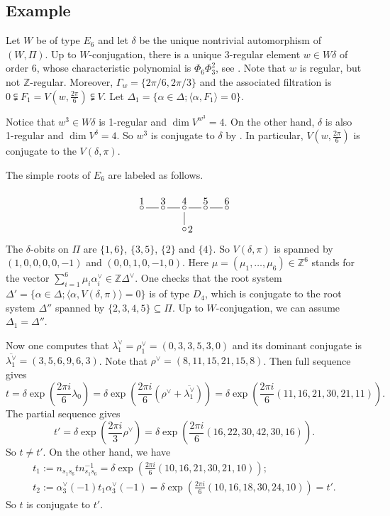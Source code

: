\documentclass[12pt,leqno]{article}
\newcommand{\G}{G}
\renewcommand{\a}{\mathfrak a}
\def\a{\alpha}
\def\G{\Gamma}
\def\d{\delta}
\def\D{\Delta}
\def\l{\lambda}
\begin{document}
\subsection{Example}\label{eg:regular} Let $W$ be of type $E_6$ and let $\d$ be the unique nontrivial automorphism of $(W, \Pi)$. Up to $W$-conjugation, there is a unique 3-regular element $w \in W \d$ of order 6, whose characteristic polynomial is $\Phi_6 \Phi_3^2$, see \cite[Table 8]{springer_regular}. Note that $w$ is regular, but not $\mathbb Z$-regular. Moreover, $\G_w=\{2\pi/6, 2\pi/3\}$ and the associated filtration is $0 \subsetneqq F_1 = V(w,\frac{2\pi}{6}) \subsetneqq V$. Let $\D_1 = \{\a \in \D; \langle\alpha, F_1\rangle = 0\}$.

Notice that $w^3 \in W\d$ is 1-regular and $\dim V^{w^3}=4$. On the other hand, $\d$ is also 1-regular and $\dim V^\d=4$. So $w^3$ is conjugate to $\d$ by \cite[Theorem 6.4 (iv)]{springer_regular}. In particular, $V(w, \frac{2\pi}{6})$ is conjugate to the $V(\d, \pi)$.

The simple roots of $E_6$ are labeled as follows.
\[
\begin{tikzpicture}[baseline = 20, scale=1.5]
\node at (-1,0) {$\circ$};
\node[above] at (-1, 0) {$1$};
\draw (-0.9,0) to (-0.6,0);
\node at (-0.5,0) {$\circ$};
\node[above] at (-0.5, 0) {$3$};
\draw (-0.4,0) to (-0.1,0);
\node at (0,0) {$\circ$};
\node[above] at (0, 0) {$4$};
\draw (0.1,0) to (0.4,0);
\node at (0.5,0) {$\circ$};
\node[above] at (0.5, 0) {$5$};
\draw (0.6,0) to (0.9,0);
\node at (1,0) {$\circ$};
\node[above] at (1, 0) {$6$};
\draw (0,-0.1) to (0,-0.4);
\node at (0,-0.5) {$\circ$};
\node[right] at (0, -0.5) {$2$};
\end{tikzpicture}
\] The $\d$-obits on $\Pi$ are $\{1, 6\}$, $\{3, 5\}$, $\{2\}$ and $\{4\}$. So $V(\d, \pi)$ is spanned by $(1, 0, 0, 0, 0, -1)$ and $(0, 0, 1, 0, -1, 0)$. Here $\mu=(\mu_1, \dots, \mu_6) \in \mathbb Z^6$ stands for the vector $\sum_{i=1}^6 \mu_i \a_i^\vee \in \mathbb Z \D^\vee$. One checks that the root system $\D' = \{\a \in \D; \langle \a, V(\d, \pi)\rangle=0\}$ is of type $D_4$, which is conjugate to the root system $\D''$ spanned by $\{2, 3, 4, 5\} \subseteq \Pi$. Up to $W$-conjugation, we can assume $\D_1 = \D''$.

Now one computes that $\l_1^\vee = \rho_1^\vee=(0, 3, 3, 5, 3, 0)$ and its dominant conjugate is $\overline{\l_1^\vee}=(3, 5, 6, 9, 6, 3)$. Note that $\rho^\vee=(8, 11, 15, 21, 15, 8)$. Then full sequence gives $$t=\d \exp(\frac{2\pi i}{6} \l_0) = \d \exp(\frac{2\pi i}{6} (\rho^\vee + \overline{\l_1^\vee}))=\d \exp(\frac{2\pi i}{6} (11, 16, 21, 30, 21, 11)).$$ The partial sequence gives $$t'= \d \exp(\frac{2\pi i}{3} \rho^\vee)=\d \exp(\frac{2\pi i}{6} (16, 22, 30, 42, 30, 16)).$$ So $t \neq t'$. On the other hand, we have \begin{gather*} t_1:=n_{s_1 s_6} t n_{s_1 s_6}^{-1} = \d \exp(\frac{2\pi i}{6}(10, 16, 21, 30, 21, 10)); \\ t_2:=\a_3^\vee(-1) t_1 \a_3^\vee(-1)=\d \exp(\frac{2\pi i}{6}(10, 16, 18, 30, 24, 10))=t'.\end{gather*} So $t$ is conjugate to $t'$.
\end{document}
